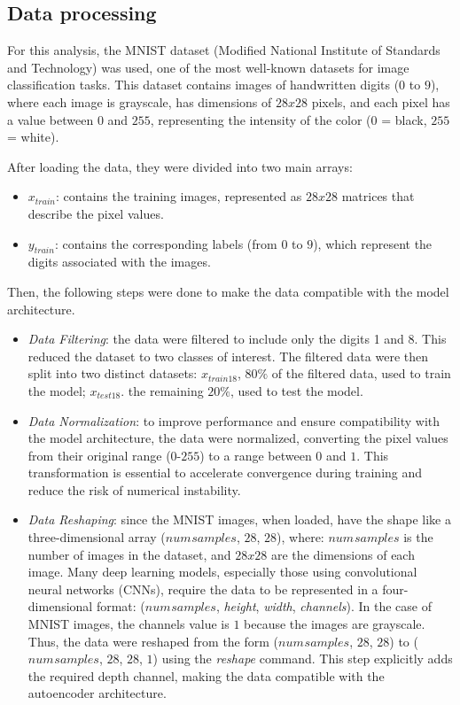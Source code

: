 \documentclass[9pt,technote]{IEEEtran}
\begin{document}
\subsection{Data processing}
For this analysis, the MNIST dataset (Modified National Institute of Standards and Technology) was used, one of the most well-known datasets for image classification tasks. This dataset contains images of handwritten digits ($0$ to $9$), where each image is grayscale, has dimensions of $28x28$ pixels, and each pixel has a value between $0$ and $255$, representing the intensity of the color ($0$ = black, $255$ = white).

After loading the data, they were divided into two main arrays:
\begin{itemize}
	\item \textit{$x_{train}$}: contains the training images, represented as $28x28$ matrices that describe the pixel values.
	\item \textit{$y_{train}$}: contains the corresponding labels (from $0$ to $9$), which represent the digits associated with the images.
\end{itemize}
Then, the following steps were done to make the data compatible with the model architecture.
\begin{itemize}
	\item \textit{Data Filtering}: the data were filtered to include only the digits 1 and 8. This reduced the dataset to two classes of interest. The filtered data were then split into two distinct datasets: $x_{train18}$, $80\%$ of the filtered data, used to train the model; $x_{test18}$. the remaining $20\%$, used to test the model.
	\item \textit{Data Normalization}: to improve performance and ensure compatibility with the model architecture, the data were normalized, converting the pixel values from their original range ($0$-$255$) to a range between $0$ and $1$. This transformation is essential to accelerate convergence during training and reduce the risk of numerical instability.
	\item \textit{Data Reshaping}: since the MNIST images, when loaded, have the shape like a three-dimensional array (\textit{$num_{}samples$}, $28$, $28$), where: \textit{$num_{}samples$} is the number of images in the dataset, and $28x28$ are the dimensions of each image.
	Many deep learning models, especially those using convolutional neural networks (CNNs), require the data to be represented in a four-dimensional format: (\textit{$num_{}samples$}, \textit{height}, \textit{width}, \textit{channels}). In the case of MNIST images, the channels value is $1$ because the images are grayscale.
	Thus, the data were reshaped from the form (\textit{$num_{}samples$}, $28$, $28$) to (\textit{$num_{}samples$}, $28$, $28$, $1$) using the \textit{reshape} command. This step explicitly adds the required depth channel, making the data compatible with the autoencoder architecture.
\end{itemize}
\end{document}
